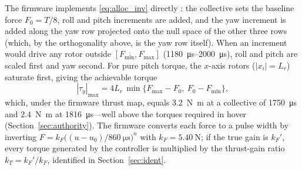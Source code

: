The firmware implements \eqref{eq:alloc_inv} directly \cite{johansen2013}: the collective sets the baseline force $F_0=T/8$, roll and pitch increments are added, and the yaw increment is added along the yaw row projected onto the null space of the other three rows (which, by the orthogonality above, is the yaw row itself). When an increment would drive any rotor outside $[F_{\min},F_{\max}]$ (\SIrange{1180}{2000}{\micro\second}), roll and pitch are scaled first and yaw second. For pure pitch torque, the $x$-axis rotors ($|x_i|=L_r$) saturate first, giving the achievable torque
\begin{equation}
  |\tau_y|_{\max}=4L_r\,\min\{F_{\max}-F_0,\ F_0-F_{\min}\},
  \label{eq:taumax}
\end{equation}
which, under the firmware thrust map, equals \SI{3.2}{\newton\metre} at a collective of \SI{1750}{\micro\second} and \SI{2.4}{\newton\metre} at \SI{1816}{\micro\second}---well above the torques required in hover (Section~\ref{sec:authority}). The firmware converts each force to a pulse width by inverting $F=k_F\big((u-u_0)/\SI{860}{\micro\second}\big)^n$ with $k_F=\SI{5.40}{\newton}$; if the true gain is $k_F'$, every torque generated by the controller is multiplied by the thrust-gain ratio $k_T=k_F'/k_F$, identified in Section~\ref{sec:ident}.

